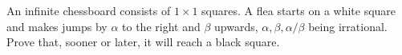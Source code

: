 An infinite chessboard consists of $1 \times 1$ squares. A flea starts on a white square and makes jumps by $\alpha$ to the right and $\beta$ upwards, $\alpha, \beta, \alpha/\beta$ being irrational. Prove that, sooner or later, it will reach a black square.
